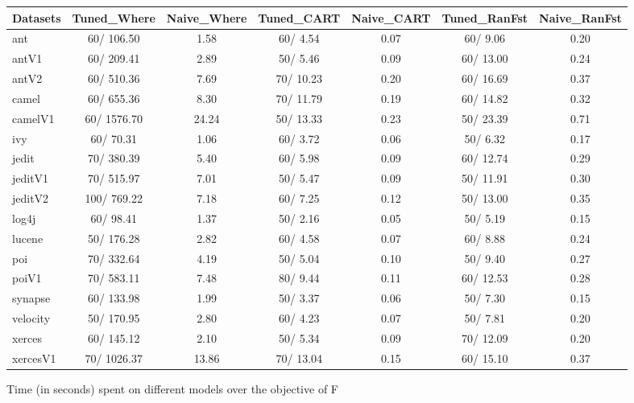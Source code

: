 \documentclass{acm_proc_article-sp}
\begin{document}
\begin{figure*}[!ht]
\scriptsize
\centering
  \begin{tabular}{l|c |c |c |c |c |c }
    \hline\hline
    Datasets & Tuned\_Where & Naive\_Where & Tuned\_CART & Naive\_CART & Tuned\_RanFst & Naive\_RanFst\\
    \hline
    ant & 60/ 106.50 & 1.58 & 60/ 4.54 & 0.07 & 60/ 9.06 & 0.20\\
    antV1 & 60/ 209.41 & 2.89 & 50/ 5.46 & 0.09 & 60/ 13.00 & 0.24\\
    antV2 & 60/ 510.36 & 7.69 & 70/ 10.23 & 0.20 & 60/ 16.69 & 0.37\\
    camel & 60/ 655.36 & 8.30 & 70/ 11.79 & 0.19 & 60/ 14.82 & 0.32\\
    camelV1 & 60/ 1576.70 & 24.24 & 50/ 13.33 & 0.23 & 50/ 23.39 & 0.71\\
    ivy & 60/ 70.31 & 1.06 & 60/ 3.72 & 0.06 & 50/ 6.32 & 0.17\\
    jedit & 70/ 380.39 & 5.40 & 60/ 5.98 & 0.09 & 60/ 12.74 & 0.29\\
    jeditV1 & 70/ 515.97 & 7.01 & 50/ 5.47 & 0.09 & 50/ 11.91 & 0.30\\
    jeditV2 & 100/ 769.22 & 7.18 & 60/ 7.25 & 0.12 & 50/ 13.00 & 0.35\\
    log4j & 60/ 98.41 & 1.37 & 50/ 2.16 & 0.05 & 50/ 5.19 & 0.15\\
    lucene & 50/ 176.28 & 2.82 & 60/ 4.58 & 0.07 & 60/ 8.88 & 0.24\\
    poi & 70/ 332.64 & 4.19 & 50/ 5.04 & 0.10 & 50/ 9.40 & 0.27\\
    poiV1 & 70/ 583.11 & 7.48 & 80/ 9.44 & 0.11 & 60/ 12.53 & 0.28\\
    synapse & 60/ 133.98 & 1.99 & 50/ 3.37 & 0.06 & 50/ 7.30 & 0.15\\
    velocity & 50/ 170.95 & 2.80 & 60/ 4.23 & 0.07 & 50/ 7.81 & 0.20\\
    xerces & 60/ 145.12 & 2.10 & 50/ 5.34 & 0.09 & 70/ 12.09 & 0.20\\
    xercesV1 & 70/ 1026.37 & 13.86 & 70/ 13.04 & 0.15 & 60/ 15.10 & 0.37\\
  \end{tabular}
  \caption{Time (in seconds) spent on different models over the objective of F}
\end{figure*}
\end{document}
